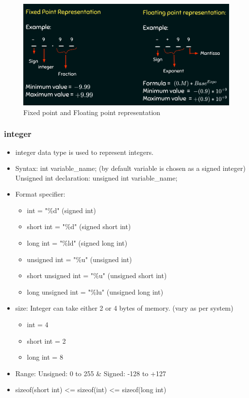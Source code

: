 \begin{figure}[H]
    \begin{center}
        \includegraphics[width=\textwidth]{images/fixedFloating.png}
        \caption{Fixed point and Floating point representation}
        \label{fixedFloating}
    \end{center}
\end{figure}


\subsubsection{integer}

\begin{itemize}
    \item integer data type is used to represent integers.
    \item Syntax: int variable\_name; (by default variable is chosen as a signed integer)\\
    Unsigned int declaration: unsigned int variable\_name; \\
    \item Format specifier: 
    \begin{itemize}
        \item int = "\%d" (signed int)
        \item short int = "\%d" (signed short int)
        \item long int = "\%ld" (signed long int)
        \item unsigned int = "\%u" (unsigned int)
        \item short unsigned int = "\%u" (unsigned short int)
        \item long unsigned int = "\%lu" (unsigned long int)
    \end{itemize} 
    \item size: Integer can take either 2 or 4 bytes of memory. (vary as per system)
    \begin{itemize}
        \item int = 4
        \item short int = 2
        \item long int = 8
    \end{itemize} 
    \item Range: Unsigned: 0 to 255 \& Signed: -128 to +127
    \item sizeof(short int) <= sizeof(int) <= sizeof(long int)
\end{itemize}


